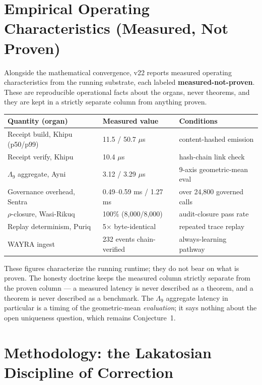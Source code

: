 \documentclass[11pt]{article}
\theoremstyle{plain}
\theoremstyle{definition}
\theoremstyle{remark}
\newcommand{\La}{\Lambda}
\begin{document}
\section{Empirical Operating Characteristics (Measured, Not Proven)}

Alongside the mathematical convergence, v22 reports measured operating
characteristics from the running substrate, each labeled \textbf{measured-not-proven}.
These are reproducible operational facts about the organs, never theorems, and they
are kept in a strictly separate column from anything proven.

\begin{center}
\begin{tabular}{@{}lll@{}}
\toprule
\textbf{Quantity (organ)} & \textbf{Measured value} & \textbf{Conditions} \\
\midrule
Receipt build, Khipu (p50/p99) & 11.5 / 50.7 $\mu$s & content-hashed emission \\
Receipt verify, Khipu & 10.4 $\mu$s & hash-chain link check \\
$\La_9$ aggregate, Ayni & 3.12 / 3.29 $\mu$s & 9-axis geometric-mean eval \\
Governance overhead, Sentra & 0.49--0.59 ms / 1.27 ms & over 24,800 governed calls \\
$\rho$-closure, Wasi-Rikuq & 100\% (8,000/8,000) & audit-closure pass rate \\
Replay determinism, Puriq & 5$\times$ byte-identical & repeated trace replay \\
WAYRA ingest & 232 events chain-verified & always-learning pathway \\
\bottomrule
\end{tabular}
\end{center}

These figures characterize the running runtime; they do not bear on what is proven.
The honesty doctrine keeps the measured column strictly separate from the proven
column --- a measured latency is never described as a theorem, and a theorem is never
described as a benchmark. The $\La_9$ aggregate latency in particular is a timing of
the geometric-mean \emph{evaluation}; it says nothing about the open uniqueness
question, which remains Conjecture~1.

\section{Methodology: the Lakatosian Discipline of Correction}
\end{document}
